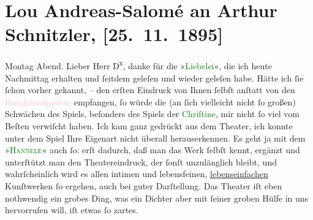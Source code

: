 

               \section[Lou Andreas-Salomé an Arthur Schnitzler, {[}25. 11. 1895{]}]{ Lou Andreas-Salomé an Arthur Schnitzler, {[}25. 11. 1895{]}}\nopagebreak{}\rehead{ }\normalsize\beginnumbering{} \toendnotes[C]{\smallbreak\pagebreak[2]} 
\toendnotes[C]{\smallbreak}\pstart
           {\pb}Montag Abend.\pend
           \pstart{}Lieber Herr \textsc{D\textsuperscript{r}},\pend\pstart
           danke für die »\textcolor{green}{Liebelei}{}\ledrightnote{\textcolor{green}{Liebelei. Schauspiel in drei Akten}}«, die ich heute Nachmittag
               erhalten und ſeitdem geleſen und wieder geleſen habe. Hätte ich ſie ſchon vorher
               gekannt, – den erſten Eindruck von Ihnen ſelbſt anſtatt von den \textcolor{pink}{Burgſchauſpielern}{}\ledrightnote{\textcolor{pink}{Burgtheater}} empfangen, ſo würde die (an ſich vielleicht
               nicht ſo großen) Schwächen des Spiels, beſonders des Spiels der \textcolor{green}{Chriſtine}{}, mir nicht ſo viel vom Beſten
               verwiſcht haben. Ich kam ganz gedrückt aus dem Theater, ich konnte unter dem Spiel
               Ihre Eigenart nicht überall herauserkennen. Es geht ja mit dem »\textcolor{green}{\textsc{Hannele}}{}\ledrightnote{\textcolor{green}{Hanneles Himmelfahrt}}« {\pb}auch ſo: erſt dadurch, daß man das
               Werk ſelbſt kennt, ergänzt und unterſtützt man den Theatereindruck, der ſonſt
               unzulänglich bleibt, und wahrſcheinlich wird es allen intimen und lebensfeinen, \uline{lebenseinfachen} Kunſtwerken ſo ergehen, auch bei guter
               Darſtellung. Das Theater iſt eben nothwendig ein grobes Ding, was ein Dichter aber
               mit ſeiner groben Hülfe in uns hervorrufen will, iſt etwas ſo zartes.\pend
